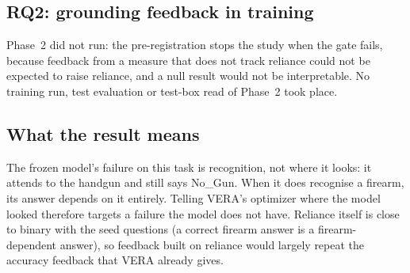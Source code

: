




\subsection{RQ2: grounding feedback in training}
Phase~2 did not run: the pre-registration stops the study when the gate fails, because feedback from a measure that does not track reliance could not be expected to raise reliance, and a null result would not be interpretable. No training run, test evaluation or test-box read of Phase~2 took place.

\subsection{What the result means}
The frozen model's failure on this task is recognition, not where it looks: it attends to the handgun and still says No\_Gun. When it does recognise a firearm, its answer depends on it entirely. Telling VERA's optimizer where the model looked therefore targets a failure the model does not have. Reliance itself is close to binary with the seed questions (a correct firearm answer is a firearm-dependent answer), so feedback built on reliance would largely repeat the accuracy feedback that VERA already gives.
